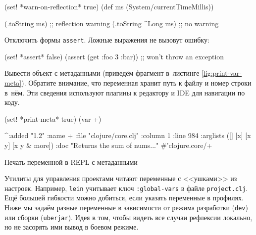 \else

\begin{english}
  \begin{clojure}
(set! *warn-on-reflection* true)
(def ms (System/currentTimeMillis))

(.toString ms)       ;; reflection warning
(.toString ^Long ms) ;; no warning
  \end{clojure}
\end{english}

\fi

Отключить формы \verb|assert|. Ложные выражения не вызовут ошибку:

\begin{english}
  \begin{clojure}
(set! *assert* false)
(assert (get {:foo 3} :bar))
;; won't throw an exception
  \end{clojure}
\end{english}

Вывести объект с метаданными (приведём фрагмент в~листинге
\ref{fig:print-var-meta}). Обратите внимание, что переменная хранит путь к файлу
и номер строки в~нём. Эти сведения используют плагины к редактору и IDE для
навигации по коду.

\begin{listing}[ht!]

\begin{english}
  \begin{clojure}
(set! *print-meta* true)
(var +)

^{:added "1.2"
  :name +
  :file "clojure/core.clj"
  :column 1
  :line 984
  :arglists ([] [x] [x y] [x y & more])
  :doc "Returns the sum of nums..."}
#'clojure.core/+
  \end{clojure}
\end{english}

\caption{Печать переменной в REPL с метаданными}
\label{fig:print-var-meta}

\end{listing}


Утилиты для управления проектами читают переменные с <<ушками>> из
настроек. Например, \verb|lein| учитывает ключ \texttt{:glo\-bal\--vars} в файле
\verb|project.clj|. Ещё большей гибкости можно добиться, если указать переменные
в профилях. Ниже мы задаём разные переменные в зависимости от режима разработки
(\verb|dev|) или сборки (\verb|uberjar|). Идея в том, чтобы видеть все случаи
рефлексии локально, но не засорять ими вывод в боевом режиме.

